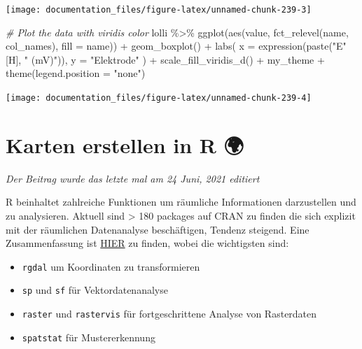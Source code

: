 \documentclass[
]{article}
\newenvironment{Shaded}{\begin{snugshade}}{\end{snugshade}}
\newcommand{\AttributeTok}[1]{\textcolor[rgb]{0.77,0.63,0.00}{#1}}
\newcommand{\CommentTok}[1]{\textcolor[rgb]{0.56,0.35,0.01}{\textit{#1}}}
\newcommand{\FunctionTok}[1]{\textcolor[rgb]{0.00,0.00,0.00}{#1}}
\newcommand{\NormalTok}[1]{#1}
\newcommand{\SpecialCharTok}[1]{\textcolor[rgb]{0.00,0.00,0.00}{#1}}
\newcommand{\StringTok}[1]{\textcolor[rgb]{0.31,0.60,0.02}{#1}}
\providecommand{\tightlist}{%
  \setlength{\itemsep}{0pt}\setlength{\parskip}{0pt}}
\begin{document}
\begin{center}\texttt{[image: documentation\_files/figure-latex/unnamed-chunk-239-3]} \end{center}

\begin{Shaded}
\begin{Highlighting}[]

\CommentTok{\# Plot the data with viridis color}
\NormalTok{lolli }\SpecialCharTok{\%\textgreater{}\%}
  \FunctionTok{ggplot}\NormalTok{(}\FunctionTok{aes}\NormalTok{(value, }\FunctionTok{fct\_relevel}\NormalTok{(name, col\_names), }\AttributeTok{fill =}\NormalTok{ name)) }\SpecialCharTok{+} 
  \FunctionTok{geom\_boxplot}\NormalTok{() }\SpecialCharTok{+}
  \FunctionTok{labs}\NormalTok{(}
    \AttributeTok{x =} \FunctionTok{expression}\NormalTok{(}\FunctionTok{paste}\NormalTok{(}\StringTok{"E"}\NormalTok{ [H], }\StringTok{" (mV)"}\NormalTok{)),}
    \AttributeTok{y =} \StringTok{"Elektrode"}
\NormalTok{  ) }\SpecialCharTok{+}
  \FunctionTok{scale\_fill\_viridis\_d}\NormalTok{() }\SpecialCharTok{+}
\NormalTok{  my\_theme }\SpecialCharTok{+}
  \FunctionTok{theme}\NormalTok{(}\AttributeTok{legend.position =} \StringTok{"none"}\NormalTok{)}
\end{Highlighting}
\end{Shaded}

\begin{center}\texttt{[image: documentation\_files/figure-latex/unnamed-chunk-239-4]} \end{center}

\hypertarget{karten-erstellen-in-r}{%
\section{Karten erstellen in R 🌍}\label{karten-erstellen-in-r}}

\emph{Der Beitrag wurde das letzte mal am 24 Juni, 2021 editiert}

R beinhaltet zahlreiche Funktionen um räumliche Informationen darzustellen und zu analysieren. Aktuell sind \textgreater{} 180 packages auf CRAN zu finden die sich explizit mit der räumlichen Datenanalyse beschäftigen, Tendenz steigend. Eine Zusammenfassung ist \href{https://cran.r-project.org/web/views/Spatial.html}{HIER} zu finden, wobei die wichtigsten sind:

\begin{itemize}
\tightlist
\item
  \texttt{rgdal} um Koordinaten zu transformieren
\item
  \texttt{sp} und \texttt{sf} für Vektordatenanalyse
\item
  \texttt{raster} und \texttt{rastervis} für fortgeschrittene Analyse von Rasterdaten
\item
  \texttt{spatstat} für Mustererkennung
\end{itemize}
\end{document}
